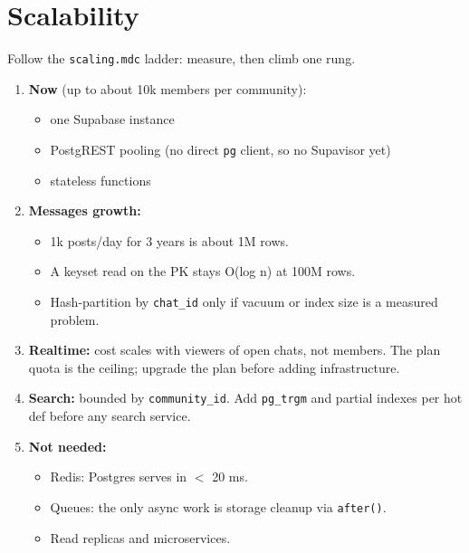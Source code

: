 \documentclass[11pt,a4paper]{article}
\newcommand{\code}[1]{\texttt{\small #1}}
\begin{document}
\section{Scalability}
Follow the \code{scaling.mdc} ladder: measure, then climb one rung.
\begin{enumerate}
  \item \textbf{Now} (up to about 10k members per community):
        \begin{itemize}
          \item one Supabase instance
          \item PostgREST pooling (no direct \code{pg} client, so no Supavisor yet)
          \item stateless functions
        \end{itemize}
  \item \textbf{Messages growth:}
        \begin{itemize}
          \item 1k posts/day for 3 years is about 1M rows.
          \item A keyset read on the PK stays O(log n) at 100M rows.
          \item Hash-partition by \code{chat\_id} only if vacuum or index size is a measured problem.
        \end{itemize}
  \item \textbf{Realtime:} cost scales with viewers of open chats, not members. The plan quota is the ceiling;
        upgrade the plan before adding infrastructure.
  \item \textbf{Search:} bounded by \code{community\_id}. Add \code{pg\_trgm} and partial indexes per hot def before
        any search service.
  \item \textbf{Not needed:}
        \begin{itemize}
          \item Redis: Postgres serves in $<$ 20 ms.
          \item Queues: the only async work is storage cleanup via \code{after()}.
          \item Read replicas and microservices.
        \end{itemize}
\end{enumerate}

\end{document}
